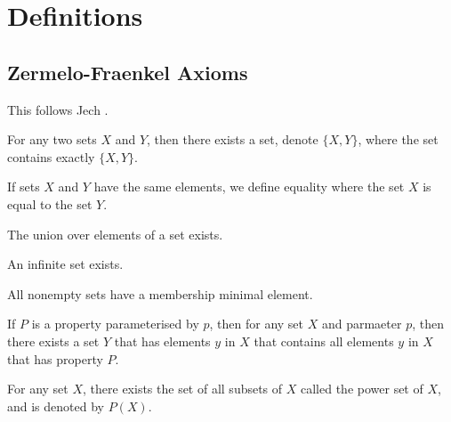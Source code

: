 \section{Definitions}

\subsection{Zermelo-Fraenkel Axioms}

This follows Jech \cite{Jech2006}.

\begin{definition}
	\label{axiom-pairing}
	For any two sets $X$ and $Y$, then there exists a set, denote $\{X, Y\}$, where the set contains exactly $\{X, Y\}$.
\end{definition}

\begin{definition}
	\label{axiom-extensionality}
	If sets $X$ and $Y$ have the same elements, we define equality where the set $X$ is equal to the set $Y$.
\end{definition}

\begin{definition}
	\label{axiom-union}
	The union over elements of a set exists.
\end{definition}

\begin{definition}
	\label{axiom-infinity}
	An infinite set exists.
\end{definition}

\begin{definition}
	\label{axiom-regularity}
	All nonempty sets have a membership minimal element.
\end{definition}

\begin{definition}
	\label{axiom-schema-separation}
	If $P$ is a property parameterised by $p$, then for any set $X$ and parmaeter $p$, then there exists a set $Y$ that has elements $y$ in $X$ that contains all elements $y$ in $X$ that has property $P$.
\end{definition}

\begin{definition}
	\label{axiom-powerset}
	For any set $X$, there exists the set of all subsets of $X$ called the power set of $X$, and is denoted by $P(X)$.
\end{definition}

